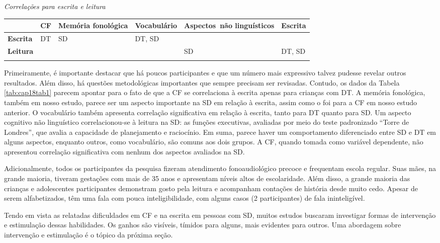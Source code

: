 \documentclass[output=paper,colorlinks,citecolor=brown,booklanguage=portuguese]{langscibook}
\begin{document}
\begin{Tabela}[H]
    \centering
    \caption{\emph{Correlações para escrita e leitura}}
     \label{tab:cap18tab1}

    \begin{tabularx}{\textwidth}{XlQlQl}
    \lsptoprule
& \textbf{CF} & \textbf{Memória fonológica} & \textbf{Vocabulário} &\textbf{Aspectos~não linguísticos}&\textbf{Escrita}\\
\midrule
\textbf{Escrita} & DT & SD & DT, SD &&\\
\textbf{Leitura} &&&& SD &DT, SD\\
\lspbottomrule
    \end{tabularx}
\end{Tabela}

Primeiramente, é importante destacar que há poucos participantes e que um número mais expressivo talvez pudesse revelar outros resultados. Além disso, há questões metodológicas importantes que sempre precisam ser revisadas. Contudo, os dados da Tabela \ref{tab:cap18tab1} parecem apontar para o fato de que a CF se correlaciona à escrita apenas para crianças com DT. A memória fonológica, também em nosso estudo, parece ser um aspecto importante na SD em relação à escrita, assim como o foi para a CF em nosso estudo anterior. O vocabulário também apresenta correlação significativa em relação à escrita, tanto para DT quanto para SD. Um aspecto cognitivo não linguístico correlacionou-se à leitura na SD: as funções executivas, avaliadas por meio do teste padronizado “Torre de Londres”, que avalia a capacidade de planejamento e raciocínio. Em suma, parece haver um comportamento diferenciado entre SD e DT em alguns aspectos, enquanto outros, como vocabulário, são comuns aos dois grupos. A CF, quando tomada como variável dependente, não apresentou correlação significativa com nenhum dos aspectos avaliados na SD.

Adicionalmente, todos os participantes da pesquisa fizeram atendimento fonoaudiológico precoce e frequentam escola regular. Suas mães, na grande maioria, tiveram gestações com mais de 35 anos e apresentam níveis altos de escolaridade. Além disso, a grande maioria das crianças e adolescentes participantes demonstram gosto pela leitura e acompanham contações de história desde muito cedo. Apesar de serem alfabetizados, têm uma fala com pouca inteligibilidade, com alguns casos (2 participantes) de fala ininteligível.

Tendo em vista as relatadas dificuldades em CF e na escrita em pessoas com SD, muitos estudos buscaram investigar formas de intervenção e estimulação dessas habilidades. Os ganhos são visíveis, tímidos para alguns, mais evidentes para outros. Uma abordagem sobre intervenção e estimulação é o tópico da próxima seção.
\end{document}
